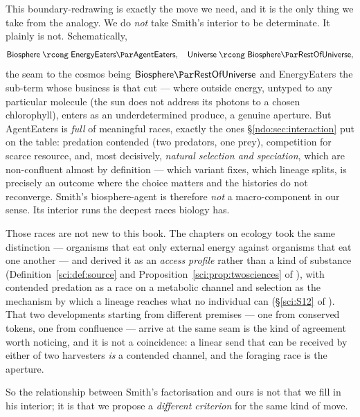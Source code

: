This boundary-redrawing is exactly the move we need, and it is the only thing we take
from the analogy. We do \emph{not} take Smith's interior to be determinate. It plainly
is not. Schematically,
\[
\textsf{Biosphere} \;\rcong\; \textsf{EnergyEaters} \Par \textsf{AgentEaters},
\quad
\textsf{Universe} \;\rcong\; \textsf{Biosphere} \Par \textsf{RestOfUniverse},
\]
the seam to the cosmos being $\textsf{Biosphere} \Par \textsf{RestOfUniverse}$ and
\textsf{EnergyEaters} the sub-term whose business is that cut --- where outside energy,
untyped to any particular molecule (the sun does not address its photons to a chosen
chlorophyll), enters as an underdetermined produce, a genuine aperture. But
\textsf{AgentEaters} is \emph{full} of meaningful races, exactly the ones
\S\ref{ndo:sec:interaction} put on the table: predation contended (two predators, one
prey), competition for scarce resource, and, most decisively, \emph{natural selection
and speciation}, which are non-confluent almost by definition --- which variant fixes,
which lineage splits, is precisely an outcome where the choice matters and the
histories do not reconverge. Smith's biosphere-agent is therefore \emph{not} a
macro-component in our sense. Its interior runs the deepest races biology has.

Those races are not new to this book. The chapters on ecology took the same
distinction --- organisms that eat only external energy against organisms that eat one
another --- and derived it as an \emph{access profile} rather than a kind of substance
(Definition~\ref{sci:def:source} and Proposition~\ref{sci:prop:twosciences} of
\chSci), with contended predation as a race on a metabolic channel and selection as
the mechanism by which a lineage reaches what no individual can
(\S\ref{sci:S12} of \chSci). That two developments starting from different premises
--- one from conserved tokens, one from confluence --- arrive at the same seam is the
kind of agreement worth noticing, and it is not a coincidence: a linear send that can
be received by either of two harvesters \emph{is} a contended channel, and the
foraging race is the aperture.

So the relationship between Smith's factorisation and ours is not that we fill in his
interior; it is that we propose a \emph{different criterion} for the same kind of move.

